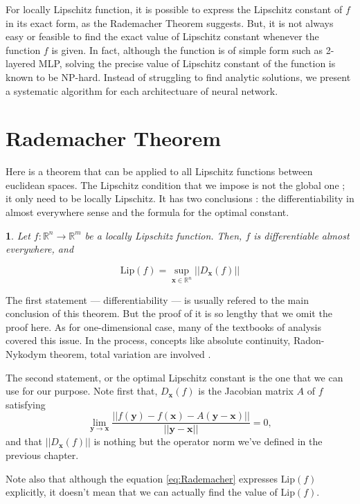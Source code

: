 \documentclass[12pt]{report}
\numberwithin{figure}{chapter}
\theoremstyle{plain}
\newtheorem{theorem}{\protect\theoremname}[chapter]
\theoremstyle{definition}
\theoremstyle{corollary}
\theoremstyle{definition}
\theoremstyle{plain}
\theoremstyle{definition}
\theoremstyle{plain}
\providecommand{\theoremname}{Theorem}
\newcommand\bx{\ensuremath{\boldsymbol x}}
\newcommand\by{\ensuremath{\boldsymbol y}}
\newcommand\lip{\ensuremath{\text{Lip}}}
\begin{document}
For locally Lipschitz function, it is possible to express the Lipschitz constant of \(f\) in its exact form, as the Rademacher Theorem suggests.
But, it is not always easy or feasible to find the exact value of Lipschitz constant whenever the function \(f\) is given.
In fact, although the function is of simple form such as 2-layered MLP, solving the precise value of Lipschitz constant of the function is known to be NP-hard.
Instead of struggling to find analytic solutions, we present a systematic algorithm for each architectuare of neural network\cite{VA-SK}.

\section{Rademacher Theorem}
Here is a theorem that can be applied to all Lipschitz functions between euclidean spaces.
The Lipschitz condition that we impose is not the global one ; it only need to be locally Lipschitz.
It has two conclusions : the differentiability in almost everywhere sense and the formula for the optimal constant.

\begin{theorem}\label{theo:Rademacher}
\cite{HF}
Let \(f:\mathbb R^n\to\mathbb R^m\) be a locally Lipschitz function.
Then,
\(f\) is differentiable almost everywhere, and
\end{theorem}
\begin{equation}\label{eq:Rademacher}
\lip(f) = \sup_{\bx\in\mathbb R^n}||D_{\bx}(f)||
\end{equation}

The first statement --- differentiability --- is usually refered to the main conclusion of this theorem.
But the proof of it is so lengthy that we omit the proof here.
As for one-dimensional case, many of the textbooks of analysis covered this issue.
In the process, concepts like absolute continuity, Radon-Nykodym theorem, total variation are involved \cite{WR}.

The second statement, or the optimal Lipschitz constant is the one that we can use for our purpose.
Note first that, \(D_{\bx}(f)\) is the Jacobian matrix \(A\) of \(f\) satisfying
\[\lim_{\by\to\bx}\frac{||f(\by)-f(\bx)-A(\by-\bx)||}{||\by-\bx||}=0,\]
and that \(||D_{\bx}(f)||\) is nothing but the operator norm we've defined in the previous chapter.

Note also that although the equation \eqref{eq:Rademacher} expresses \(\lip(f)\) explicitly, it doesn't mean that we can actually find the value of \(\lip(f)\).
\end{document}
